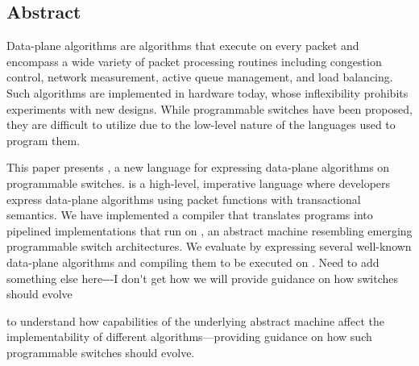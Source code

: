 \subsection*{Abstract}

Data-plane algorithms are algorithms that execute on every packet and encompass
a wide variety of packet processing routines including congestion control,
network measurement, active queue management, and load balancing. Such 
algorithms are implemented in hardware today, whose inflexibility prohibits
experiments with new designs. While programmable switches have been proposed, 
they are difficult to utilize due to the low-level nature of the languages
used to program them.

This paper presents \pktlanguage, a new language for expressing data-plane
algorithms on programmable switches. \pktlanguage is a high-level, imperative
language where developers express data-plane algorithms using packet functions
with transactional semantics. We have implemented a compiler that translates
\pktlanguage programs into pipelined implementations that run on \absmachine,
an abstract
machine resembling emerging programmable switch architectures. We evaluate
\pktlanguage by expressing
several well-known data-plane algorithms and compiling them to be executed
on \absmachine. \ac{Need to add something else here---I don't get how we will provide guidance on how switches should evolve}

to understand how capabilities of
the underlying abstract machine affect the implementability of different
algorithms---providing guidance on how such programmable switches should
evolve.
\fi
